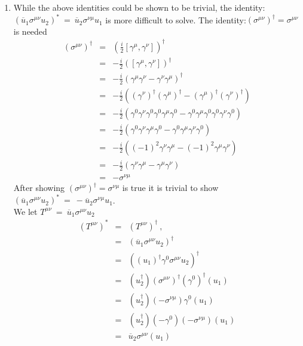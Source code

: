 \documentclass[12pt]{article}
\def \bea{\begin{eqnarray}}
\def \eea{\end{eqnarray}}
\def \ou{\overline{u}}
\def \ga{\gamma}
\def \si{\sigma}
\begin{document}
\begin{enumerate}
\item  While the above identities could be shown to be trivial, the identity: $(\ou_1 \si^{\mu\nu} u_2)^* ~=~\ou_2 \si^{\nu\mu} u_1$ is more difficult to solve. The identity:$(\si^{\mu\nu})^\dag =\si^{\mu\nu}$ is needed
\bea
(\si^{\mu\nu})^\dag &=& (\frac{i}{2}[\ga^\mu,\ga^\nu])^\dag \\
&=& -\frac{i}{2}([\ga^\mu,\ga^\nu])^\dag\\
&=& -\frac{i}{2}(\ga^\mu\ga^\nu-\ga^\nu\ga^\mu)^\dag \\
&=& -\frac{i}{2}((\ga^\nu)^\dag(\ga^\mu)^\dag-(\ga^\mu)^\dag(\ga^\nu)^\dag) \\
&=& -\frac{i}{2}(\ga^0\ga^\nu\ga^0\ga^0\ga^\mu\ga^0-\ga^0\ga^\mu\ga^0\ga^0\ga^\nu\ga^0)\\
&=& -\frac{i}{2}(\ga^0\ga^\nu\ga^\mu\ga^0-\ga^0\ga^\mu \ga^\nu\ga^0)\\
&=& -\frac{i}{2}((-1)^2\ga^\nu\ga^\mu-(-1)^2\ga^\mu \ga^\nu) \\
&=& -\frac{i}{2}(\ga^\nu\ga^\mu-\ga^\mu \ga^\nu)\\
&=& -\si^{\nu\mu}
\eea
After showing $(\si^{\mu\nu})^\dag =\si^{\nu\mu}$ is true it is trivial to show $(\ou_1 \si^{\mu\nu} u_2)^* ~=~ -\ou_2 \si^{\nu\mu} u_1$.\\
We let $T^{\mu\nu} ~=~ \ou_1 \si^{\mu\nu} u_2$
\bea
(T^{\mu\nu})^* &=& (T^{\mu\nu})^\dag ~,~~ \\
&=& (\ou_1 \si^{\mu\nu} u_2)^\dag \\
&=& ((u_1)^\dag \ga^0 \si^{\mu\nu} u_2)^\dag \\
&=& (u_2^\dag)(\si^{\mu\nu})^\dag (\ga^0)^\dag(u_1)\\
&=& (u_2^\dag)(-\si^{\nu\mu})\ga^0(u_1)\\
&=& (u_2^\dag)(-\ga^0)(-\si^{\nu\mu})(u_1)\\
&=& \ou_2 \si^{\mu\nu}(u_1)
\eea


\end{enumerate}
\end{document}
